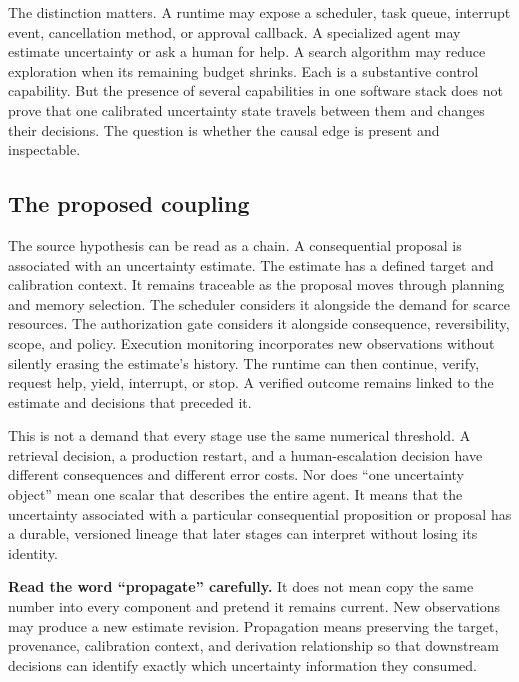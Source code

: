 The distinction matters. A runtime may expose a scheduler, task queue, interrupt event, cancellation method, or approval callback. A specialized agent may estimate uncertainty or ask a human for help. A search algorithm may reduce exploration when its remaining budget shrinks. Each is a substantive control capability. But the presence of several capabilities in one software stack does not prove that one calibrated uncertainty state travels between them and changes their decisions. The question is whether the causal edge is present and inspectable.

\subsection{The proposed coupling}
\label{sec:ch16-b6-proposed-coupling}

The source hypothesis can be read as a chain. A consequential proposal is associated with an uncertainty estimate. The estimate has a defined target and \gls{calibration} context. It remains traceable as the proposal moves through planning and memory selection. The scheduler considers it alongside the demand for scarce resources. The authorization gate considers it alongside consequence, reversibility, scope, and policy. Execution monitoring incorporates new observations without silently erasing the estimate's history. The runtime can then continue, verify, request help, yield, interrupt, or stop. A verified outcome remains linked to the estimate and decisions that preceded it.

This is not a demand that every stage use the same numerical threshold. A retrieval decision, a production restart, and a human-escalation decision have different consequences and different error costs. Nor does ``one uncertainty object'' mean one scalar that describes the entire agent. It means that the uncertainty associated with a particular consequential proposition or proposal has a durable, versioned lineage that later stages can interpret without losing its identity.

\begin{tipbox}
\textbf{Read the word ``propagate'' carefully.} It does not mean copy the same number into every component and pretend it remains current. New observations may produce a new estimate revision. Propagation means preserving the target, provenance, calibration context, and derivation relationship so that downstream decisions can identify exactly which uncertainty information they consumed.
\end{tipbox}


